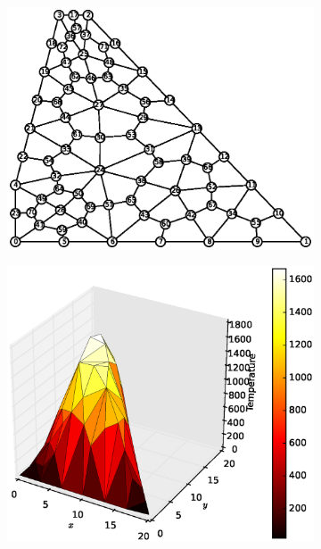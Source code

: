 \documentclass[10pt, a4paper]{article}
\begin{document}
\begin{figure}[H]
\centering
	\begin{subfigure}[H]{0.3\textwidth}
		\includegraphics[width=1.2\textwidth]{fig/exdam2_1.eps}
		\caption{}
		\label{fig:1}
	\end{subfigure}
	\begin{subfigure}[H]{0.33\textwidth}
		\includegraphics[width=\textwidth]{fig/exdam2_2.eps}
		\caption{}
		\label{fig:2}
	\end{subfigure}
	\begin{subfigure}[H]{0.33\textwidth}

\end{subfigure}
\end{figure}
\end{document}
